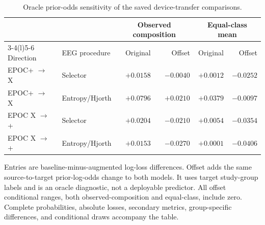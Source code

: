 \begin{table}[htbp]
\centering
\caption{Oracle prior-odds sensitivity of the saved device-transfer comparisons.}
\label{tab:offset}
\begin{tabular}{@{}llrrrr@{}}
\toprule
& & \multicolumn{2}{c}{Observed composition} & \multicolumn{2}{c}{Equal-class mean} \\
\cmidrule(lr){3-4}\cmidrule(l){5-6}
Direction & EEG procedure & Original & Offset & Original & Offset \\
\midrule
EPOC+ $\to$ X & Selector & $+0.0158$ & $-0.0040$ & $+0.0012$ & $-0.0252$ \\
EPOC+ $\to$ X & Entropy/Hjorth & $+0.0796$ & $+0.0210$ & $+0.0379$ & $-0.0097$ \\
EPOC X $\to$ + & Selector & $+0.0204$ & $-0.0210$ & $+0.0054$ & $-0.0354$ \\
EPOC X $\to$ + & Entropy/Hjorth & $+0.0153$ & $-0.0270$ & $+0.0001$ & $-0.0406$ \\
\bottomrule
\end{tabular}
\par\smallskip\begin{minipage}{\textwidth}
Entries are baseline-minus-augmented log-loss differences. Offset adds the same source-to-target prior-log-odds change to both models. It uses target study-group labels and is an oracle diagnostic, not a deployable predictor. All offset conditional ranges, both observed-composition and equal-class, include zero. Complete probabilities, absolute losses, secondary metrics, group-specific differences, and conditional draws accompany the table.
\end{minipage}
\end{table}
